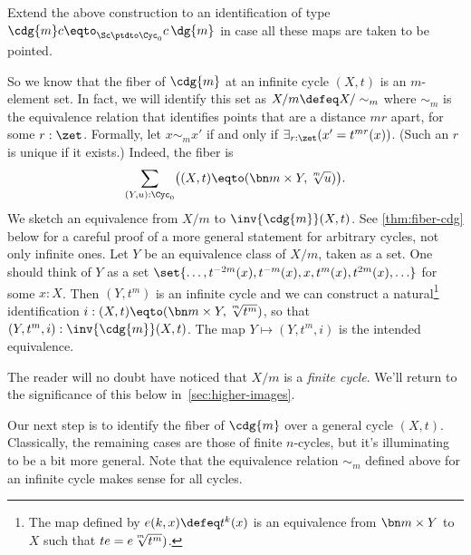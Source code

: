 \begin{xca}\label{xca:pointed-maps-circle}
Extend the above construction to an identification of type $\cdg{m}c\eqto_{\Sc\ptdto\Cyc_0}c\,\dg{m}$
in case all these maps are taken to be pointed.
\end{xca}

So we know that the fiber of $\cdg{m}$ at an infinite cycle $(X,t)$
is an $m$-element set. In fact, we will identify this set as
$X/m \defeq X/\sim_m$ where $\sim_m$ is the equivalence relation that
identifies points that are a distance $mr$ apart, for some $r:\zet$.
Formally, let $x\sim_m x'$ if and only if $\exists_{r:\zet}(x'=t^{mr}(x))$.
(Such an $r$ is unique if it exists.)
Indeed, the fiber is
\[
  \sum_{(Y,u):\Cyc_0}\bigl((X,t) \eqto (\bn m\times Y, \sqrt[\uproot{2}m]{u})\bigr).
\]
We sketch an equivalence from $X/m$ to $\inv{\cdg{m}}(X,t)$.
See \cref{thm:fiber-cdg} below for a careful proof of a
more general statement for arbitrary cycles, not only infinite ones.
Let $Y$ be an equivalence class of $X/m$, taken as a set.
One should think of $Y$ as a set
$\set{\ldots,t^{-2m}(x),t^{-m}(x),x,t^m(x),t^{2m}(x),\ldots}$
for some $x:X$. Then $(Y,t^m)$ is an infinite cycle and we can construct a
natural\footnote{%
The map defined by $e(k,x)\defeq t^k(x)$ is an equivalence from
$\bn m\times Y$ to $X$ such that $te=e\sqrt[\uproot{2}m]{t^m})$.}
identification $i:(X,t) \eqto (\bn m\times Y, \sqrt[\uproot{2}m]{t^m})$,
so that $(Y,t^m,i): \inv{\cdg{m}}(X,t)$. The map $Y\mapsto(Y,t^m,i)$
is the intended equivalence.

The reader will no doubt have noticed that $X/m$ is a \emph{finite cycle}.
We'll return to the significance of this below in~\cref{sec:higher-images}.

Our next step is to identify the fiber of $\cdg{m}$ over a general cycle $(X,t)$.
Classically, the remaining cases are those of finite $n$-cycles,
but it's illuminating to be a bit more general.
Note that the equivalence relation $\sim_m$ defined above for an infinite cycle
makes sense for all cycles.

